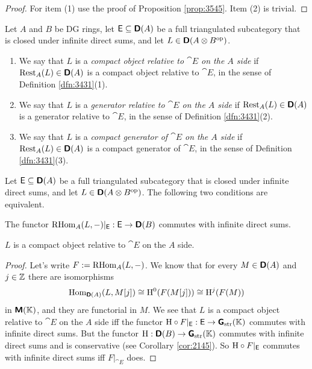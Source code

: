 \begin{proof}
For item (1) use the proof of Proposition \ref{prop:3545}. Item (2) is trivial. 
\end{proof}

\begin{dfn} \label{dfn:3465}
Let $A$ and $B$ be DG rings, let $\operatorname{\mathsf{E}} \subseteq \boldsymbol{\mathsf{D}}(A)$ be a 
full triangulated subcategory that is closed under infinite direct sums, and 
let $L \in \boldsymbol{\mathsf{D}}(A \otimes B^{\mathrm{op}})$. 
\begin{enumerate}
\item We say that $L$ is a {\em compact object relative to $\cat{E}$ on the 
$A$ side} if $\operatorname{Rest}_A(L) \in \boldsymbol{\mathsf{D}}(A)$ is a compact object relative to 
$\cat{E}$, in the sense of Definition \lb \ref{dfn:3431}(1).

\item We say that $L$ is a {\em generator relative to $\cat{E}$ on the 
$A$ side} if $\operatorname{Rest}_A(L) \in \boldsymbol{\mathsf{D}}(A)$ is a generator relative to 
$\cat{E}$, in the sense of Definition \ref{dfn:3431}(2).

\item We say that $L$ is a {\em compact generator of $\cat{E}$ on the $A$ side} 
if $\operatorname{Rest}_A(L) \in \boldsymbol{\mathsf{D}}(A)$ is 
a compact generator of $\cat{E}$, in the sense of Definition \ref{dfn:3431}(3).
\end{enumerate}
\end{dfn}

\begin{lem} \label{lem:3436}
Let $\operatorname{\mathsf{E}} \subseteq \boldsymbol{\mathsf{D}}(A)$ be a full triangulated subcategory that is 
closed under infinite direct sums, and let 
$L \in \boldsymbol{\mathsf{D}}(A \otimes B^{\mathrm{op}})$. The following 
two conditions are equivalent.
\begin{itemize}
 The functor
$\operatorname{RHom}_A(L, -)|_{\operatorname{\mathsf{E}}} : \operatorname{\mathsf{E}} \to \boldsymbol{\mathsf{D}}(B)$
commutes with infinite direct sums.

 $L$ is a compact object relative to $\cat{E}$ on the $A$ side. 
\end{itemize}
\end{lem}

\begin{proof}
Let's write 
$F := \operatorname{RHom}_A(L, -)$. We know that for every $M \in \boldsymbol{\mathsf{D}}(A)$ and 
$j \in \mathbb{Z}$ there are isomorphisms
\[ \operatorname{Hom}_{\boldsymbol{\mathsf{D}}(A)}(L, M[j]) \cong 
\mathrm{H}^0(F(M[j])) \cong \mathrm{H}^j (F(M))  \]
in $\boldsymbol{\mathsf{M}}(\mathbb{K})$, and they are functorial in $M$.
We see that $L$ is a compact object relative to $\cat{E}$ on the $A$ side iff
the functor
$\mathrm{H} \circ F|_{\operatorname{\mathsf{E}}} : \operatorname{\mathsf{E}} \to \boldsymbol{\mathsf{G}}_{\mathrm{str}}(\mathbb{K})$
commutes with infinite direct sums. But the functor 
$ \mathrm{H} : \boldsymbol{\mathsf{D}}(B) \to \boldsymbol{\mathsf{G}}_{\mathrm{str}}(\mathbb{K})$ 
commutes with infinite direct sums and is conservative (see Corollary 
\ref{cor:2145}). 
So $\mathrm{H} \circ F|_{\operatorname{\mathsf{E}}}$ commutes with infinite direct 
sums iff $F|_{\cat{E}}$ does. 
\end{proof}

